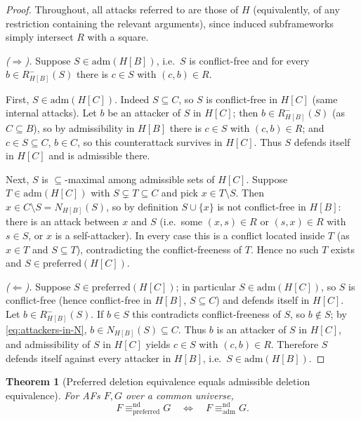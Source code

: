 \documentclass{amsart}
\newtheorem{theorem}{Theorem}
\theoremstyle{remark}
\begin{document}
\begin{proof}
Throughout, all attacks referred to are those of $H$ (equivalently, of any
restriction containing the relevant arguments), since induced subframeworks
simply intersect $R$ with a square.

\smallskip
\emph{($\Rightarrow$).}  Suppose $S\in\mathrm{adm}(H[B])$, i.e.\ $S$ is
conflict-free and for every $b\in R^-_{H[B]}(S)$ there is $c\in S$ with
$(c,b)\in R$.

First, $S\in\mathrm{adm}(H[C])$.  Indeed $S\subseteq C$, so $S$ is conflict-free
in $H[C]$ (same internal attacks).  Let $b$ be an attacker of $S$ in $H[C]$;
then $b\in R^-_{H[B]}(S)$ (as $C\subseteq B$), so by admissibility in $H[B]$
there is $c\in S$ with $(c,b)\in R$; and $c\in S\subseteq C$, $b\in C$, so this
counterattack survives in $H[C]$.  Thus $S$ defends itself in $H[C]$ and is
admissible there.

Next, $S$ is $\subseteq$-maximal among admissible sets of $H[C]$.  Suppose $T\in
\mathrm{adm}(H[C])$ with $S\subsetneq T\subseteq C$ and pick $x\in T\setminus
S$.  Then $x\in C\setminus S=N_{H[B]}(S)$, so by definition $S\cup\{x\}$ is not
conflict-free in $H[B]$: there is an attack between $x$ and $S$ (i.e.\ some
$(x,s)\in R$ or $(s,x)\in R$ with $s\in S$, or $x$ is a self-attacker).  In every
case this is a conflict located inside $T$ (as $x\in T$ and $S\subseteq T$),
contradicting the conflict-freeness of $T$.  Hence no such $T$ exists and
$S\in\mathrm{preferred}(H[C])$.

\smallskip
\emph{($\Leftarrow$).}  Suppose $S\in\mathrm{preferred}(H[C])$; in particular
$S\in\mathrm{adm}(H[C])$, so $S$ is conflict-free (hence conflict-free in $H[B]$,
$S\subseteq C$) and defends itself in $H[C]$.  Let $b\in R^-_{H[B]}(S)$.  If
$b\in S$ this contradicts conflict-freeness of $S$, so $b\notin S$; by
\eqref{eq:attackers-in-N}, $b\in N_{H[B]}(S)\subseteq C$.  Thus $b$ is an
attacker of $S$ in $H[C]$, and admissibility of $S$ in $H[C]$ yields $c\in S$
with $(c,b)\in R$.  Therefore $S$ defends itself against every attacker in
$H[B]$, i.e.\ $S\in\mathrm{adm}(H[B])$.
\end{proof}

\begin{theorem}[Preferred deletion equivalence equals admissible deletion
equivalence]\label{thm:pref-adm}
For AFs $F,G$ over a common universe,
\[
F\equiv^{\mathrm{nd}}_{\mathrm{preferred}}G
\quad\Longleftrightarrow\quad
F\equiv^{\mathrm{nd}}_{\mathrm{adm}}G .
\]
\end{theorem}
\end{document}
